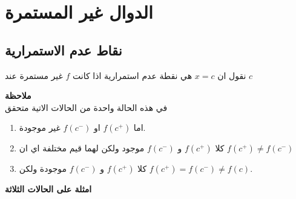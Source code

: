 \chapter{الدوال غير المستمرة}

\section{نقاط عدم الاستمرارية}

\begin{definition}
	نقول  ان $x=c$ هي نقطة عدم استمرارية اذا كانت $f$ غير مستمرة عند $c$
\end{definition}

\noindent
\textbf{ملاحظة}\\
في هذه الحالة واحدة من الحالات الاتية متحقق
\begin{enumerate}
	\item اما $f(c^+)$ او $f(c^-)$ غير موجودة.
	\item كلا $f(c^+)$ و $f(c^-)$ موجود ولكن لهما قيم مختلفة اي ان $f(c^+) \neq f(c^-)$
\item كلا $f(c^+)$ و $f(c^-)$ موجودة ولكن $f(c^+) = f(c^-) \neq f(c)$.
\end{enumerate}
\vspace{5pt}
\noindent
\textbf{امثلة على الحالات الثلاثة}
